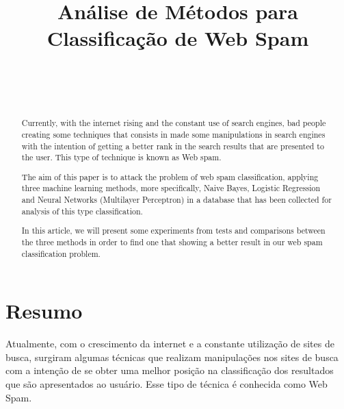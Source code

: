 \documentclass[10pt, conference, compsocconf]{IEEEtran}
\begin{document}
\title{Análise de Métodos para Classificação de Web Spam}

\author{
\\
\and
{}
\\
}
\maketitle 

\begin{abstract}
Currently, with the internet rising and the constant use of search engines, bad people creating some techniques that consists in made some manipulations in search engines with the intention of getting a better rank in the search results that are presented to the user. This type of technique is known as Web spam.

The aim of this paper is to attack the problem of web spam classification, applying three machine learning methods, more specifically, Naive Bayes, Logistic Regression and Neural Networks (Multilayer Perceptron) in a database that has been collected for analysis of this type classification.

In this article, we will present some experiments from tests and comparisons between the three methods in order to find one that showing a better result in our web spam classification problem.

\end{abstract}

\section{Resumo}
Atualmente, com o crescimento da internet e a constante utilização de sites de busca, surgiram algumas técnicas que realizam manipulações nos sites de busca com a intenção de se obter uma melhor posição na classificação dos resultados que são apresentados ao usuário. Esse tipo de técnica é conhecida como Web Spam.
\end{document}
